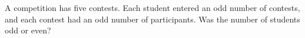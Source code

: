 A competition has five contests. Each student entered an odd number of contests, and each contest had an odd number of participants. Was the number of students odd or even?
